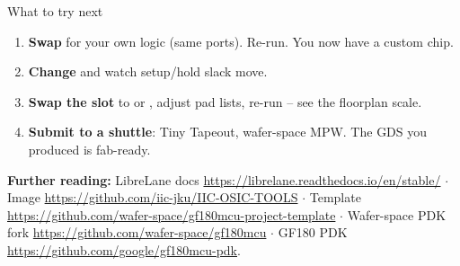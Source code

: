 \begin{frame}{What to try next}
  \begin{enumerate}\small
    \item \textbf{Swap } for your own logic (same ports).
          Re-run. You now have a custom chip.
    \item \textbf{Change } and watch setup/hold slack move.
    \item \textbf{Swap the slot} to  or , adjust pad
          lists, re-run -- see the floorplan scale.
    \item \textbf{Submit to a shuttle}: Tiny Tapeout, wafer-space MPW. The
          GDS you produced is fab-ready.
  \end{enumerate}
  \vspace{0.6em}
  \footnotesize
  \textbf{Further reading:}
  LibreLane docs \url{https://librelane.readthedocs.io/en/stable/} $\cdot$
  Image \url{https://github.com/iic-jku/IIC-OSIC-TOOLS} $\cdot$
  Template \url{https://github.com/wafer-space/gf180mcu-project-template} $\cdot$
  Wafer-space PDK fork \url{https://github.com/wafer-space/gf180mcu} $\cdot$
  GF180 PDK \url{https://github.com/google/gf180mcu-pdk}.
\end{frame}
